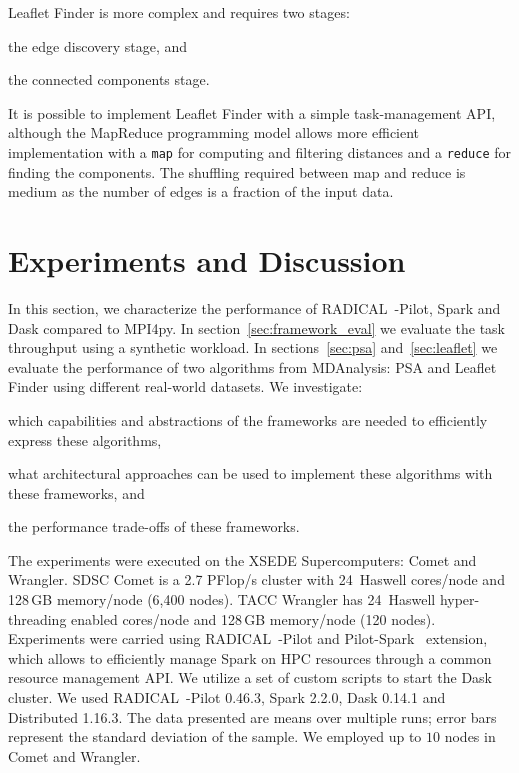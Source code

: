 Leaflet Finder is more complex and requires two stages:
\begin{inparaenum}[a)]
    \item the edge discovery stage, and
    \item the connected components stage.
\end{inparaenum}
It is possible to implement Leaflet Finder with a simple task-management API, although the MapReduce programming model allows more efficient implementation with a \texttt{map} for computing and filtering distances and a \texttt{reduce} for finding the components.
The shuffling required between map and reduce is medium as the number of edges is a fraction of the input data.

\section{Experiments and Discussion}
\label{impl_exp}
In this section, we characterize the performance of RADICAL~-Pilot, Spark and Dask compared to MPI4py.
In section~\ref{sec:framework_eval} we evaluate the task throughput using a synthetic workload.
In sections~\ref{sec:psa} and~\ref{sec:leaflet} we evaluate the performance of two algorithms from MDAnalysis: PSA and Leaflet Finder using different real-world datasets.
We investigate: 
\begin{inparaenum}[1)]
    \item which capabilities and abstractions of the frameworks are needed to efficiently express these algorithms,
    \item what architectural approaches can be used to implement these algorithms with these frameworks, and
    \item the performance trade-offs of these frameworks.
\end{inparaenum}

The experiments were executed on the XSEDE Supercomputers: Comet and Wrangler.
SDSC Comet is a 2.7 PFlop/s cluster with 24\, Haswell cores/node and 128\,GB memory/node (6,400 nodes).
TACC Wrangler has 24\, Haswell hyper-threading enabled cores/node and 128\,GB memory/node (120 nodes).
Experiments were carried using RADICAL~-Pilot and Pilot-Spark~\cite{luckow2016hadoop} extension, which allows to efficiently manage Spark on HPC resources through a common resource management API.
We utilize a set of custom scripts to start the Dask cluster.
We used RADICAL~-Pilot 0.46.3, Spark 2.2.0, Dask 0.14.1 and Distributed 1.16.3.
The data presented are means over multiple runs; error bars represent the standard deviation of the sample.
We employed up to $10$ nodes in Comet and Wrangler. 

